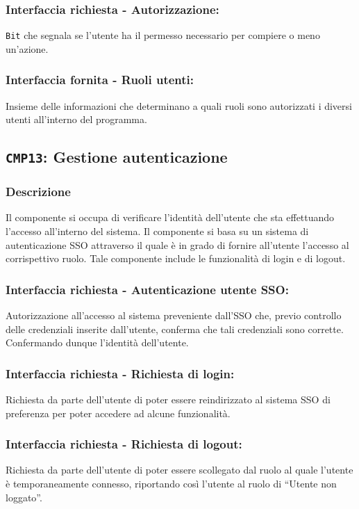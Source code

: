         \subsubsection{Interfaccia richiesta - Autorizzazione:}
            \texttt{Bit} che segnala se l'utente ha il permesso necessario per compiere o meno un'azione.
        \subsubsection{Interfaccia fornita - Ruoli utenti:}
            Insieme delle informazioni che determinano a quali ruoli sono autorizzati i diversi utenti all'interno del programma.

    \subsection{\texttt{CMP13}: Gestione autenticazione}
        \subsubsection{Descrizione}
            Il componente si occupa di verificare l'identità dell'utente che sta effettuando l'accesso all'interno del sistema. Il componente si basa su un sistema di autenticazione SSO attraverso il quale è in grado di fornire all'utente l'accesso al corrispettivo ruolo. Tale componente include le funzionalità di login e di logout.
        \subsubsection{Interfaccia richiesta - Autenticazione utente SSO:}
            Autorizzazione all'accesso al sistema preveniente dall'SSO che, previo controllo delle credenziali inserite dall'utente, conferma che tali credenziali sono corrette. Confermando dunque l'identità dell'utente.
        \subsubsection{Interfaccia richiesta - Richiesta di login:}
            Richiesta da parte dell'utente di poter essere reindirizzato al sistema SSO di preferenza per poter accedere ad alcune funzionalità.
        \subsubsection{Interfaccia richiesta - Richiesta di logout:}
            Richiesta da parte dell'utente di poter essere scollegato dal ruolo al quale l'utente è temporaneamente connesso, riportando così l'utente al ruolo di ``Utente non loggato''.
